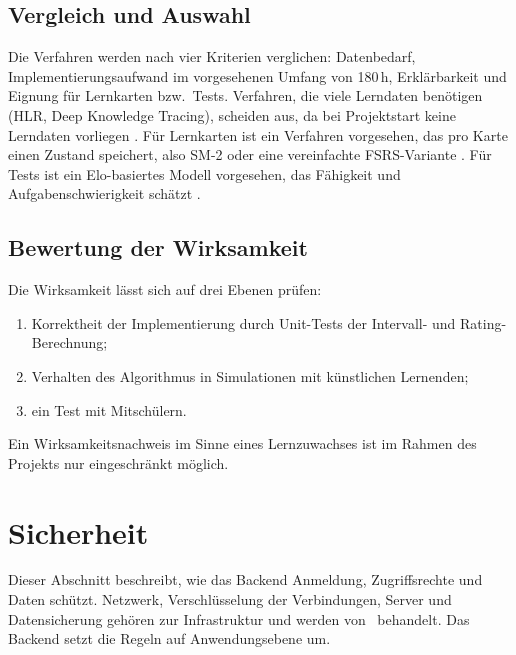 \subsection{Vergleich und Auswahl}
Die Verfahren werden nach vier Kriterien verglichen: Datenbedarf, Implementierungsaufwand im vorgesehenen Umfang von 180\,h, Erklärbarkeit und Eignung für Lernkarten bzw.\ Tests.
Verfahren, die viele Lerndaten benötigen (HLR, Deep Knowledge Tracing), scheiden aus, da bei Projektstart keine Lerndaten vorliegen \parencite{settles2016,piech2015}.
Für Lernkarten ist ein Verfahren vorgesehen, das pro Karte einen Zustand speichert, also SM-2 oder eine vereinfachte FSRS-Variante \parencite{wozniak1990,ye2022}.
Für Tests ist ein Elo-basiertes Modell vorgesehen, das Fähigkeit und Aufgabenschwierigkeit schätzt \parencite{pelanek2016}.

\subsection{Bewertung der Wirksamkeit}
Die Wirksamkeit lässt sich auf drei Ebenen prüfen:
\begin{enumerate}
    \item Korrektheit der Implementierung durch Unit-Tests der Intervall- und Rating-Berechnung;
    \item Verhalten des Algorithmus in Simulationen mit künstlichen Lernenden;
    \item ein Test mit Mitschülern.
\end{enumerate}
Ein Wirksamkeitsnachweis im Sinne eines Lernzuwachses ist im Rahmen des Projekts nur eingeschränkt möglich.


\section{Sicherheit}
\label{sec:sicherheit}
 
 
Dieser Abschnitt beschreibt, wie das Backend Anmeldung, Zugriffsrechte und Daten schützt. Netzwerk, Verschlüsselung der Verbindungen, Server und Datensicherung gehören zur Infrastruktur und werden von \Jai\ behandelt. Das Backend setzt die Regeln auf Anwendungsebene um.
 
